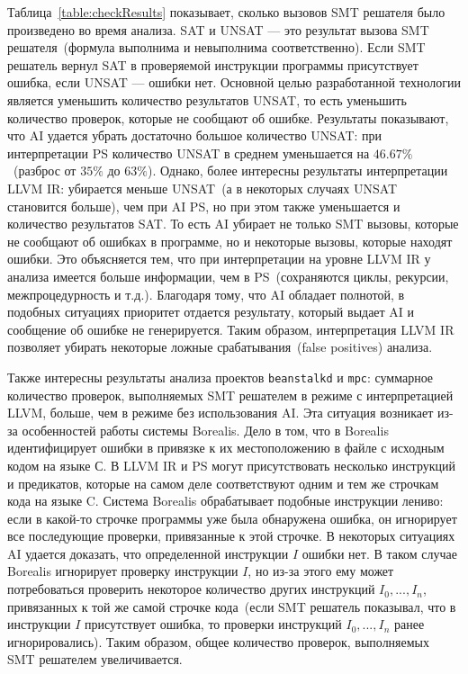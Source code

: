 Таблица~\ref{table:checkResults} показывает, сколько вызовов SMT решателя было
произведено во время анализа. SAT и UNSAT --- это результат вызова 
SMT решателя~(формула выполнима и невыполнима соответственно). Если SMT решатель
вернул SAT в проверяемой инструкции программы присутствует ошибка, если 
UNSAT --- ошибки нет. Основной целью разработанной технологии является уменьшить
количество результатов UNSAT, то есть уменьшить количество проверок, которые не
сообщают об ошибке. Результаты показывают, что AI удается убрать достаточно 
большое количество UNSAT: при интерпретации PS количество UNSAT в среднем 
уменьшается на $46.67\%$~(разброс от $35\%$ до $63\%$). Однако, более интересны 
результаты интерпретации LLVM IR: убирается меньше UNSAT~(а в некоторых
случаях UNSAT становится больше), чем при AI PS, но при этом также уменьшается 
и количество результатов SAT. То есть AI убирает не только SMT вызовы, которые 
не сообщают об ошибках в программе, но и некоторые вызовы, которые находят 
ошибки. Это объясняется тем, что при интерпретации на уровне LLVM IR у анализа 
имеется больше информации, чем в PS~(сохраняются циклы, рекурсии, 
межпроцедурность и т.д.). Благодаря тому, что AI обладает полнотой, в подобных
ситуациях приоритет отдается результату, который выдает AI и сообщение об
ошибке не генерируется. Таким образом, интерпретация LLVM IR позволяет убирать
некоторые ложные срабатывания~(false positives) анализа.

Также интересны результаты анализа проектов \texttt{beanstalkd} и \texttt{mpc}:
суммарное количество проверок, выполняемых SMT решателем в режиме с 
интерпретацией LLVM, больше, чем в режиме без использования AI. Эта ситуация
возникает из-за особенностей работы системы Borealis. Дело в том, что в Borealis
идентифицирует ошибки в привязке к их местоположению в файле с исходным кодом на
языке С. В LLVM IR и PS могут присутствовать несколько инструкций и предикатов, 
которые на самом деле соответствуют одним и тем же строчкам кода на языке C.
Система Borealis обрабатывает подобные инструкции лениво: если в какой-то
строчке программы уже была обнаружена ошибка, он игнорирует все последующие 
проверки, привязанные к этой строчке. В некоторых ситуациях AI удается доказать,
что определенной инструкции $I$ ошибки нет. В таком случае Borealis игнорирует
проверку инструкции $I$, но из-за этого ему может потребоваться проверить 
некоторое количество других инструкций $I_0, ..., I_n$, привязанных к той же 
самой строчке кода~(если SMT решатель показывал, что в инструкции $I$ 
присутствует ошибка, то проверки инструкций $I_0, ..., I_n$ ранее 
игнорировались). Таким образом, общее количество проверок, выполняемых 
SMT решателем увеличивается.


